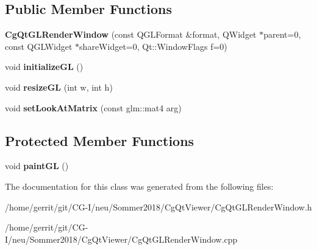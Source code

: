 \subsection*{Public Member Functions}
\begin{DoxyCompactItemize}
\item 
\mbox{\label{class_cg_qt_g_l_render_window_ab258317b683b0bdb385bb27c56f6cf15}} 
{\bfseries Cg\+Qt\+G\+L\+Render\+Window} (const Q\+G\+L\+Format \&format, Q\+Widget $\ast$parent=0, const Q\+G\+L\+Widget $\ast$share\+Widget=0, Qt\+::\+Window\+Flags f=0)
\item 
\mbox{\label{class_cg_qt_g_l_render_window_a32f7419b0434af35e3b7160dc4522f53}} 
void {\bfseries initialize\+GL} ()
\item 
\mbox{\label{class_cg_qt_g_l_render_window_abc693fb8146bd52d5cee975041c0db92}} 
void {\bfseries resize\+GL} (int w, int h)
\item 
\mbox{\label{class_cg_qt_g_l_render_window_a0795d89d932ce2261db257fe73aeea8e}} 
void {\bfseries set\+Look\+At\+Matrix} (const glm\+::mat4 arg)
\end{DoxyCompactItemize}
\subsection*{Protected Member Functions}
\begin{DoxyCompactItemize}
\item 
\mbox{\label{class_cg_qt_g_l_render_window_a7ac538a6da3b425638c44888ccc618dc}} 
void {\bfseries paint\+GL} ()
\end{DoxyCompactItemize}


The documentation for this class was generated from the following files\+:\begin{DoxyCompactItemize}
\item 
/home/gerrit/git/\+C\+G-\/\+I/neu/\+Sommer2018/\+Cg\+Qt\+Viewer/Cg\+Qt\+G\+L\+Render\+Window.\+h\item 
/home/gerrit/git/\+C\+G-\/\+I/neu/\+Sommer2018/\+Cg\+Qt\+Viewer/Cg\+Qt\+G\+L\+Render\+Window.\+cpp\end{DoxyCompactItemize}
